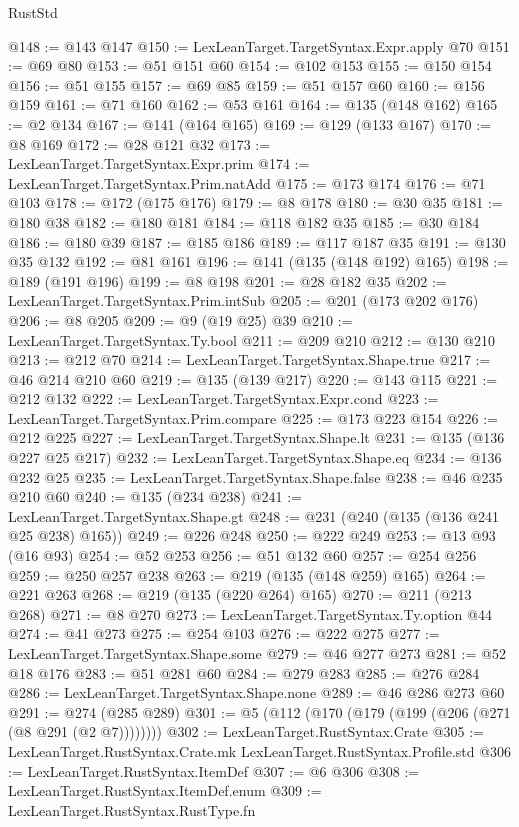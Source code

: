 \begin{lexlean}{RustStd}
\begin{coremodule}
@148 := @143 @147
@150 := LexLeanTarget.TargetSyntax.Expr.apply @70
@151 := @69 @80
@153 := @51 @151 @60
@154 := @102 @153
@155 := @150 @154
@156 := @51 @155
@157 := @69 @85
@159 := @51 @157 @60
@160 := @156 @159
@161 := @71 @160
@162 := @53 @161
@164 := @135 (@148 @162)
@165 := @2 @134
@167 := @141 (@164 @165)
@169 := @129 (@133 @167)
@170 := @8 @169
@172 := @28 @121 @32
@173 := LexLeanTarget.TargetSyntax.Expr.prim
@174 := LexLeanTarget.TargetSyntax.Prim.natAdd
@175 := @173 @174
@176 := @71 @103
@178 := @172 (@175 @176)
@179 := @8 @178
@180 := @30 @35
@181 := @180 @38
@182 := @180 @181
@184 := @118 @182 @35
@185 := @30 @184
@186 := @180 @39
@187 := @185 @186
@189 := @117 @187 @35
@191 := @130 @35 @132
@192 := @81 @161
@196 := @141 (@135 (@148 @192) @165)
@198 := @189 (@191 @196)
@199 := @8 @198
@201 := @28 @182 @35
@202 := LexLeanTarget.TargetSyntax.Prim.intSub
@205 := @201 (@173 @202 @176)
@206 := @8 @205
@209 := @9 (@19 @25) @39
@210 := LexLeanTarget.TargetSyntax.Ty.bool
@211 := @209 @210
@212 := @130 @210
@213 := @212 @70
@214 := LexLeanTarget.TargetSyntax.Shape.true
@217 := @46 @214 @210 @60
@219 := @135 (@139 @217)
@220 := @143 @115
@221 := @212 @132
@222 := LexLeanTarget.TargetSyntax.Expr.cond
@223 := LexLeanTarget.TargetSyntax.Prim.compare
@225 := @173 @223 @154
@226 := @212 @225
@227 := LexLeanTarget.TargetSyntax.Shape.lt
@231 := @135 (@136 @227 @25 @217)
@232 := LexLeanTarget.TargetSyntax.Shape.eq
@234 := @136 @232 @25
@235 := LexLeanTarget.TargetSyntax.Shape.false
@238 := @46 @235 @210 @60
@240 := @135 (@234 @238)
@241 := LexLeanTarget.TargetSyntax.Shape.gt
@248 := @231 (@240 (@135 (@136 @241 @25 @238) @165))
@249 := @226 @248
@250 := @222 @249
@253 := @13 @93 (@16 @93)
@254 := @52 @253
@256 := @51 @132 @60
@257 := @254 @256
@259 := @250 @257 @238
@263 := @219 (@135 (@148 @259) @165)
@264 := @221 @263
@268 := @219 (@135 (@220 @264) @165)
@270 := @211 (@213 @268)
@271 := @8 @270
@273 := LexLeanTarget.TargetSyntax.Ty.option @44
@274 := @41 @273
@275 := @254 @103
@276 := @222 @275
@277 := LexLeanTarget.TargetSyntax.Shape.some
@279 := @46 @277 @273
@281 := @52 @18 @176
@283 := @51 @281 @60
@284 := @279 @283
@285 := @276 @284
@286 := LexLeanTarget.TargetSyntax.Shape.none
@289 := @46 @286 @273 @60
@291 := @274 (@285 @289)
@301 := @5 (@112 (@170 (@179 (@199 (@206 (@271 (@8 @291 (@2 @7))))))))
@302 := LexLeanTarget.RustSyntax.Crate
@305 := LexLeanTarget.RustSyntax.Crate.mk LexLeanTarget.RustSyntax.Profile.std
@306 := LexLeanTarget.RustSyntax.ItemDef
@307 := @6 @306
@308 := LexLeanTarget.RustSyntax.ItemDef.enum
@309 := LexLeanTarget.RustSyntax.RustType.fn

\end{coremodule}
\end{lexlean}
